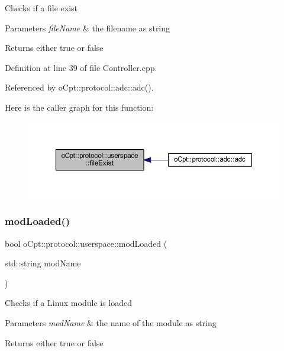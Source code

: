 Checks if a file exist 
\begin{DoxyParams}{Parameters}
{\em file\+Name} & the filename as string \\
\hline
\end{DoxyParams}
\begin{DoxyReturn}{Returns}
either true or false 
\end{DoxyReturn}


Definition at line 39 of file Controller.\+cpp.



Referenced by o\+Cpt\+::protocol\+::adc\+::adc().

Here is the caller graph for this function\+:\nopagebreak
\begin{figure}[H]
\begin{center}
\leavevmode
\includegraphics[width=350pt]{classo_cpt_1_1protocol_1_1userspace_a3c35e581abd2a06de6feb160e25ac35b_icgraph}
\end{center}
\end{figure}
\hypertarget{classo_cpt_1_1protocol_1_1userspace_aac8635fbc254fff76642cf6910484a02}{}\label{classo_cpt_1_1protocol_1_1userspace_aac8635fbc254fff76642cf6910484a02} 
\subsubsection{\texorpdfstring{mod\+Loaded()}{modLoaded()}}
{\footnotesize\ttfamily bool o\+Cpt\+::protocol\+::userspace\+::mod\+Loaded (\begin{DoxyParamCaption}\item[{std\+::string}]{mod\+Name }\end{DoxyParamCaption})\hspace{0.3cm}{\ttfamily [protected]}}

Checks if a Linux module is loaded 
\begin{DoxyParams}{Parameters}
{\em mod\+Name} & the name of the module as string \\
\hline
\end{DoxyParams}
\begin{DoxyReturn}{Returns}
either true or false 
\end{DoxyReturn}


